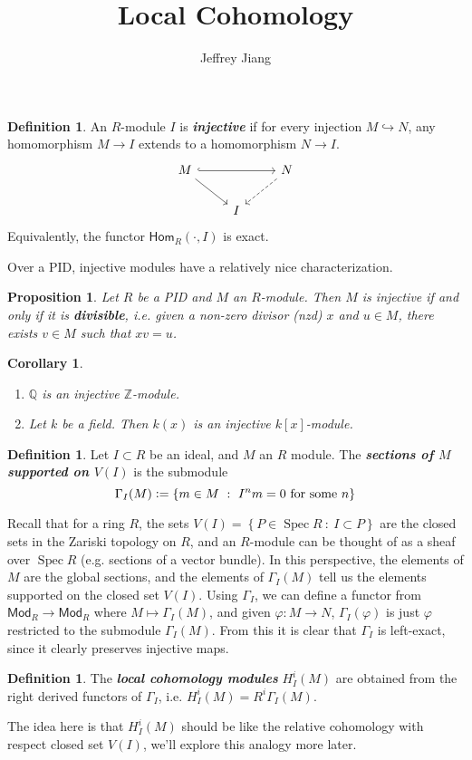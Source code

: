 \documentclass[psamsfonts, 12pt]{amsart}
\newtheorem{cor}[thm]{Corollary}
\newtheorem{prop}[thm]{Proposition}
\theoremstyle{definition}
\newtheorem{defn}[thm]{Definition}
\theoremstyle{remark}
\renewcommand{\hom}{\mathsf{Hom}}
\newcommand{\ib}[1]{\textbf{\textit{#1}}}
\newcommand{\Q}{\mathbb{Q}}
\newcommand{\Z}{\mathbb{Z}}
\newcommand{\set}[1]{\left\lbrace #1 \right\rbrace}
\newcommand{\defeq}{\vcentcolon=}
\newcommand{\enumbreak}{\ \\ \vspace{-\baselineskip}}
\DeclareMathOperator{\Spec}{Spec}
\begin{document}
%
\author{Jeffrey Jiang}
%
\title{Local Cohomology}
%
\maketitle
%
\setcounter{section}{1}
%
\begin{defn}
An $R$-module $I$ is \ib{injective} if for every injection $M \hookrightarrow N$,
any homomorphism $M \to I$ extends to a homomorphism $N \to I$.
\[\begin{tikzcd}
M \ar[dr]\ar[rr, hookrightarrow] && N \ar[dl, dashed] \\
& I
\end{tikzcd}\]
Equivalently, the functor $\hom_R(\cdot,I)$ is exact.
\end{defn}
%
Over a PID, injective modules have a relatively nice characterization.
%
\begin{prop}
Let $R$ be a PID and $M$ an $R$-module. Then $M$ is injective if and only if it
is \ib{divisible}, i.e. given a non-zero divisor (nzd) $x$ and $u \in M$, there exists
$v \in M$ such that $xv = u$.
\end{prop}
%
\begin{cor} \enumbreak
\begin{enumerate}
  \item $\Q$ is an injective $\Z$-module.
  \item Let $k$ be a field. Then $k(x)$ is an injective $k[x]$-module.
\end{enumerate}
\end{cor}
%
\begin{defn}
Let $I \subset R$ be an ideal, and $M$ an $R$ module. The \ib{sections of $M$
supported on $V(I)$} is the submodule
\[
\Gamma_I(M) \defeq \set{m \in M ~:~ I^nm = 0 \text{ for some $n$}}
\]
\end{defn}
%
Recall that for a ring $R$, the sets $V(I) = \set{P \in \Spec R ~:~ I \subset P}$
are the closed sets in the Zariski topology on $R$, and an $R$-module can be thought
of as a sheaf over $\Spec R$ (e.g. sections of a vector bundle). In this perspective,
the elements of $M$ are the global sections, and the elements of $\Gamma_I(M)$ tell
us the elements supported on the closed set $V(I)$. Using $\Gamma_I$, we can define a
functor from $\mathsf{Mod}_R \to \mathsf{Mod}_R$ where $M\mapsto \Gamma_I(M)$, and
given $\varphi : M \to N$, $\Gamma_I(\varphi)$ is just $\varphi$ restricted to the
submodule $\Gamma_I(M)$. From this it is clear that $\Gamma_I$ is left-exact, since
it clearly preserves injective maps.
%
\begin{defn}
The \ib{local cohomology modules} $H^i_I(M)$ are obtained from the right derived functors
of $\Gamma_I$, i.e. $H^i_I(M) = R^i\Gamma_I(M)$.
\end{defn}
%
The idea here is that $H^i_I(M)$ should be like the relative cohomology with
respect closed set $V(I)$, we'll explore this analogy more later. \\
\end{document}
